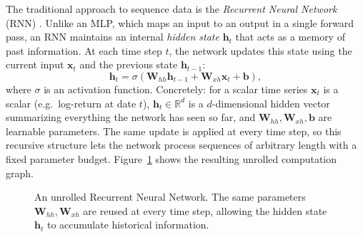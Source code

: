 \documentclass[11pt,a4paper]{report}
\newcommand{\x}{\bm{x}}
\newcommand{\h}{\bm{h}}
\newcommand{\y}{\bm{y}}
\newcommand{\bb}{\bm{b}}
\newcommand{\Wh}{\bm{W}_{hh}}
\newcommand{\Wx}{\bm{W}_{xh}}
\newcommand{\R}{\mathbb{R}}
\begin{document}
The traditional approach to sequence data is the \emph{Recurrent Neural Network} (RNN) \citep{elman1990finding}.  Unlike an MLP, which maps an input to an output in a single forward pass, an RNN maintains an internal \emph{hidden state} $\h_t$ that acts as a memory of past information.  At each time step $t$, the network updates this state using the current input $\x_t$ and the previous state $\h_{t-1}$:
\begin{equation}
\h_t = \sigma(\Wh \h_{t-1} + \Wx \x_t + \bb),
\end{equation}
where $\sigma$ is an activation function.  Concretely: for a scalar time series $\x_t$ is a scalar (e.g.\ log-return at date $t$), $\h_t \in \R^d$ is a $d$-dimensional hidden vector summarizing everything the network has seen so far, and $\Wh,\Wx,\bb$ are learnable parameters.  The same update is applied at every time step, so this recursive structure lets the network process sequences of arbitrary length with a fixed parameter budget.  Figure~\ref{fig:rnn} shows the resulting unrolled computation graph.

\begin{figure}[ht]
\centering
{}
\caption{An unrolled Recurrent Neural Network. The same parameters $\Wh, \Wx$ are reused at every time step, allowing the hidden state $\h_t$ to accumulate historical information.}
\label{fig:rnn}
\end{figure}
\end{document}
